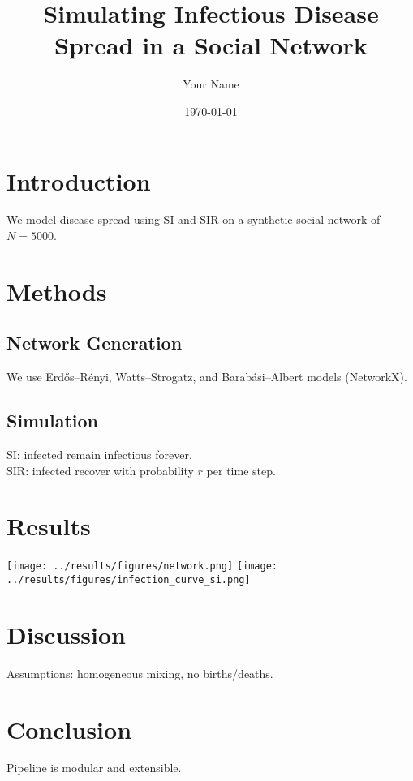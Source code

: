 \documentclass{article}
\title{Simulating Infectious Disease Spread in a Social Network}
\author{Your Name}
\date{\today}
\begin{document}
\maketitle
\section{Introduction}
We model disease spread using SI and SIR on a synthetic social network of $N=5000$.
\section{Methods}
\subsection{Network Generation}
We use Erdős–Rényi, Watts–Strogatz, and Barabási–Albert models (NetworkX).
\subsection{Simulation}
SI: infected remain infectious forever.\\
SIR: infected recover with probability $r$ per time step.
\section{Results}
\texttt{[image: ../results/figures/network.png]}
\texttt{[image: ../results/figures/infection\_curve\_si.png]}
\section{Discussion}
Assumptions: homogeneous mixing, no births/deaths.
\section{Conclusion}
Pipeline is modular and extensible.
\end{document}
